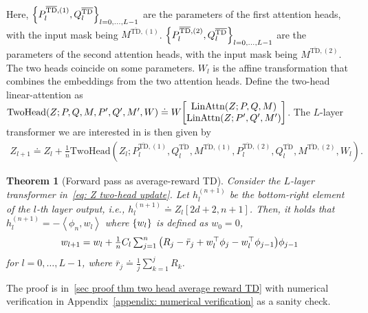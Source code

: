 \documentclass{article}
\newcommand{\indot}[2]{{\left<#1, #2\right>}}
\newcommand{\attn}{\text{LinAttn}}
\newcommand{\twohead}{\text{TwoHead}}
\newcommand{\bartd}{\overline{\text{TD}}}
\newtheorem{theorem}{Theorem}
\begin{document}
Here, $\qty{P_l^{\bartd, (1)}, Q_l^{\bartd}}_{l=0,\dots,L-1}$ are the parameters of the first attention heads,
with the input mask being $M^{\bartd, (1)}$.
$\qty{P_l^{\bartd, (2)}, Q_l^{\bartd}}_{l=0,\dots,L-1}$ are the parameters of the second attention heads,
with the input mask being $M^{\bartd, (2)}$.
The two heads coincide on some parameters.
$W_l$ is the affine transformation that combines the embeddings from the two attention heads.
Define the two-head linear-attention as
    $\twohead(Z; P, Q, M, P', Q', M', W) \doteq W \mqty[\attn(Z; P, Q, M) \\ \attn(Z; P', Q', M')]$.
The $L$-layer transformer we are interested in is then given by
\begin{align}
    \label{eq: Z two-head update}
    \textstyle Z_{l+1} \doteq Z_l + \frac{1}{n} \twohead(Z_l; P_l^{\bartd, (1)}, Q_l^{\bartd}, M^{\bartd, (1)}, P_l^{\bartd, (2)}, Q_l^{\bartd}, M^{\bartd, (2)}, W_l).
\end{align}
\begin{theorem}[Forward pass as average-reward TD]
    \label{thm two head average reward TD}
  Consider the $L$-layer transformer in~\eqref{eq: Z two-head update}.
  Let $h_l^{(n+1)}$ be the bottom-right element of the $l$-th layer output, i.e.,  $h_l^{(n+1)} \doteq Z_l[2d+2, n+1]$.
  Then, it holds that $h_l^{(n+1)} =  -\indot{\phi_n}{w_l}$ where $\qty{w_l}$ is defined as $w_0 = 0$,
  \begin{align}
   \textstyle{w_{l+1} = w_l + \frac{1}{n} C_l \sum_{j=1}^n  \qty(R_j - \bar{r}_j + w_l^\top \phi_j - w_l^\top \phi_{j-1})\phi_{j-1}}
  \end{align}
  for $l = 0, \dots, L-1$, where $\bar{r}_j \doteq \frac{1}{j}\sum_{k=1}^j R_k$.
\end{theorem}
The proof is in~\ref{sec proof thm two head average reward TD} with numerical verification in Appendix~\ref{appendix: numerical verification} as a sanity check.
\end{document}

